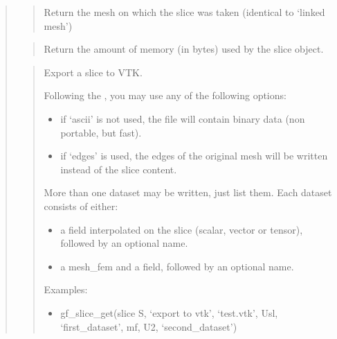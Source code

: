 \documentclass[a4paper,11pt,english]{sphinxmanual}
\begin{document}
\begin{quote}
\sphinxAtStartPar
{}
\begin{quote}

\sphinxAtStartPar
Return the mesh on which the slice was taken
(identical to ‘linked mesh’)
\end{quote}

\sphinxAtStartPar
{}
\begin{quote}

\sphinxAtStartPar
Return the amount of memory (in bytes) used by the slice object.
\end{quote}

\sphinxAtStartPar
{}
\begin{quote}

\sphinxAtStartPar
Export a slice to VTK.

\sphinxAtStartPar
Following the , you may use any of the following options:
\begin{itemize}
\item {} 
\sphinxAtStartPar
if ‘ascii’ is not used, the file will contain binary data
(non portable, but fast).

\item {} 
\sphinxAtStartPar
if ‘edges’ is used, the edges of the original mesh will be
written instead of the slice content.

\end{itemize}

\sphinxAtStartPar
More than one dataset may be written, just list them. Each dataset
consists of either:
\begin{itemize}
\item {} 
\sphinxAtStartPar
a field interpolated on the slice (scalar, vector or tensor),
followed by an optional name.

\item {} 
\sphinxAtStartPar
a mesh\_fem and a field, followed by an optional name.

\end{itemize}

\sphinxAtStartPar
Examples:
\begin{itemize}
\item {} 
\sphinxAtStartPar
gf\_slice\_get(slice S, ‘export to vtk’, ‘test.vtk’, Usl, ‘first\_dataset’, mf,
U2, ‘second\_dataset’)


\end{itemize}
\end{quote}
\end{quote}
\end{document}

